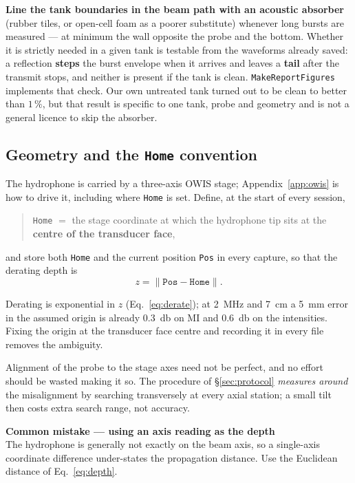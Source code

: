 \documentclass[11pt,a4paper]{article}
\newcommand{\good}[1]{\textcolor{green!45!black}{\textbf{#1}}}
\newcommand{\mistaketitle}[1]{\textcolor{orange!75!black}{\textbf{Common mistake --- #1}}\\[2pt]}
\begin{document}
\good{Line the tank boundaries in the beam path with an acoustic absorber} (rubber tiles, or
open-cell foam as a poorer substitute) whenever long bursts are measured --- at minimum the wall
opposite the probe and the bottom. Whether it is strictly needed in a given tank is testable from
the waveforms already saved: a reflection \textbf{steps} the burst envelope when it arrives and
leaves a \textbf{tail} after the transmit stops, and neither is present if the tank is clean.
\texttt{MakeReportFigures} implements that check. Our own untreated tank turned out to be clean to
better than $1\,\%$, but that result is specific to one tank, probe and geometry and is not a
general licence to skip the absorber.

\subsection{Geometry and the \texttt{Home} convention}\label{sec:home}
The hydrophone is carried by a three-axis OWIS stage; Appendix~\ref{app:owis} is how to drive it,
including where \texttt{Home} is set.
Define, at the start of every session,
\begin{quote}
  \texttt{Home} $=$ the stage coordinate at which the hydrophone tip sits at the \textbf{centre of
  the transducer face},
\end{quote}
and store both \texttt{Home} and the current position \texttt{Pos} in every capture, so that the
derating depth is
\begin{equation}
  z = \lVert \mathtt{Pos} - \mathtt{Home}\rVert .
  \label{eq:depth}
\end{equation}

Derating is exponential in $z$ (Eq.~\ref{eq:derate}); at \SI{2}{\mega\hertz} and \SI{7}{\centi\metre}
a \SI{5}{\milli\metre} error in the assumed origin is already \SI{0.3}{\decibel} on MI and
\SI{0.6}{\decibel} on the intensities. Fixing the origin at the transducer face centre and recording
it in every file removes the ambiguity.

Alignment of the probe to the stage axes need not be perfect, and no effort should be wasted making
it so. The procedure of \S\ref{sec:protocol} \emph{measures around} the misalignment by searching
transversely at every axial station; a small tilt then costs extra search range, not accuracy.

\begin{mistake}
\mistaketitle{using an axis reading as the depth}
The hydrophone is generally not exactly on the beam axis, so a single-axis coordinate difference
under-states the propagation distance. Use the Euclidean distance of Eq.~\ref{eq:depth}.
\end{mistake}
\end{document}
